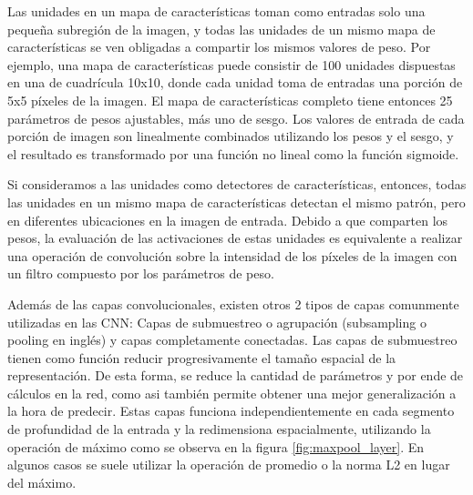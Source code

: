 \documentclass[a4paper,11pt,spanish]{book}
\begin{document}
      Las unidades en un mapa de características toman como entradas solo una pequeña subregión de la imagen, y todas las unidades de un mismo mapa de características se
      ven obligadas a compartir los mismos valores de peso.
      Por ejemplo, una mapa de características puede consistir de 100 unidades dispuestas en una de cuadrícula 10x10,
      donde cada unidad  toma de entradas una porción de 5x5 píxeles de la imagen.
      El mapa de características completo tiene entonces 25 parámetros de pesos ajustables, más uno de sesgo. 
      Los valores de entrada de cada porción de imagen son linealmente combinados utilizando los pesos y el sesgo, y el resultado es transformado por una función 
      no lineal como la función sigmoide.

      Si consideramos a las unidades como detectores de características, entonces, todas las unidades en un mismo mapa de características detectan el mismo patrón,
      pero en diferentes ubicaciones en la imagen de entrada. 
      Debido a que comparten los pesos, la evaluación de las activaciones de estas unidades es equivalente a  realizar una operación de convolución
      sobre la intensidad de los píxeles de la imagen con un filtro compuesto por los parámetros de peso.

      Además de las capas convolucionales, existen otros 2 tipos de capas comunmente utilizadas en las CNN: Capas de submuestreo o agrupación (subsampling o pooling en inglés) y
      capas completamente conectadas. Las capas de submuestreo tienen como función reducir progresivamente el tamaño espacial de la representación.
      De esta forma, se reduce la cantidad de parámetros y por ende de cálculos en la red, como asi también permite obtener una mejor generalización a la hora de predecir. 
      Estas capas funciona independientemente en cada segmento de profundidad de la entrada y la redimensiona espacialmente, utilizando la operación de máximo como se observa en
      la figura \ref{fig:maxpool_layer}. En algunos casos se suele utilizar la operación de promedio o la norma L2 en lugar del máximo.
\end{document}
